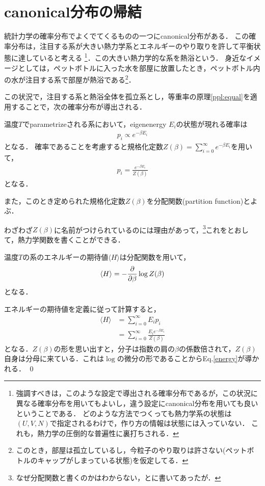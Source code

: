 	\section{canonical分布の帰結}\label{sec:fact}
	統計力学の確率分布でよくでてくるものの一つにcanonical分布がある．
	この確率分布は，注目する系が大きい熱力学系とエネルギーのやり取りを許して平衡状態に達していると考える
	\footnote{
			強調すべきは，このような設定で導出される確率分布であるが，この状況に異なる確率分布を用いてもよいし，違う設定にcanonical分布を用いても良いということである．
			どのような方法でつくっても熱力学系の状態は$(U, V, N)$で指定されるわけで，作り方の情報は状態には入っていない．
			これも，熱力学の圧倒的な普遍性に裏打ちされる．
	}．この大きい熱力学的な系を熱浴という．
	身近なイメージとしては，ペットボトルに入った水を部屋に放置したとき，ペットボトル内の水が注目する系で部屋が熱浴である\footnote{このとき，部屋は孤立しているし，今粒子のやり取りは許さない(ペットボトルのキャップがしまっている状態)を仮定してる．}．
	
	この状況で，注目する系と熱浴全体を孤立系とし，等重率の原理\ref{ppl:equal}を適用することで，次の確率分布が導出される．

	\begin{fact}[canonical分布]\label{fact:canonical_dist}
			温度$T$でparametrizeされる系において，eigenenergy $E_i$の状態が現れる確率は
			\begin{align}
					p_i \propto e^{-\beta E_i} \label{boltzmann_factor}
			\end{align}
			となる．
			確率であることを考慮すると規格化定数$Z(\beta) = \sum_{i = 0}^{\infty} e^{-\beta E_i}$を用いて，
			\begin{align}
					p_i = \frac{e^{-\beta E_i}}{Z(\beta)}
			\end{align}
			となる．

			また，このとき定められた規格化定数$Z(\beta)$を分配関数(partition function)とよぶ．
	\end{fact}

	わざわざ$Z(\beta)$に名前がつけられているのには理由があって，\footnote{なぜ分配関数と書くのかはわからない，と\cite{Tasaki_statmech}に書いてあったが．}これをとおして，熱力学関数を書くことができる．
	\begin{thm}[energy]
			温度$T$の系のエネルギーの期待値$\langle H \rangle$は分配関数を用いて，
			\begin{align}
					\langle H \rangle = - \pdv{}{\beta} \log Z(\beta) \label{energy}
			\end{align}
			となる．
	\end{thm}
	\begin{pr}
			エネルギーの期待値を定義に従って計算すると，
			\begin{align}
					\langle H \rangle
					&= \sum _{i=0}^{\infty} E_i p_i\\
					&= \sum_{i=0}^{\infty} \frac{E_ie^{-\beta E_i}}{Z(\beta)}
			\end{align}
			となる．$Z(\beta)$の形を思い出すと，分子は指数の肩の$\beta$の係数倍されて，$Z(\beta)$自身は分母に来ている．これは$\log$の微分の形であることからEq.\eqref{energy}が導かれる． \qed
	\end{pr}

